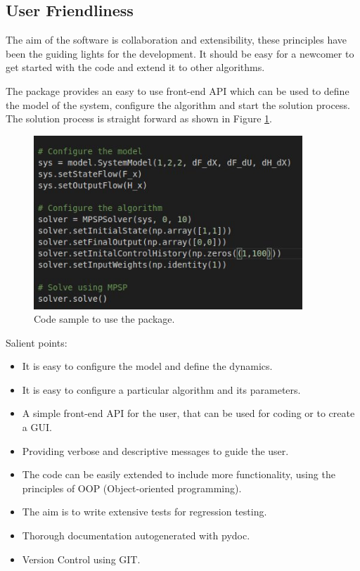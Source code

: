\documentclass[12pt]{article}
\begin{document}
\subsection{User Friendliness}

The aim of the software is collaboration and extensibility, these principles have been the guiding lights for the development. It should be easy for a newcomer to get started with the code and extend it to other algorithms.

The package provides an easy to use front-end API which can be used to define the model of the system, configure the algorithm and start the solution process. The solution process is straight forward as shown in Figure \ref{fig:CodeUsage}.

\begin{figure}[!htb]
    \centering
    \includegraphics[width=0.9\textwidth]{img/CodeUsage.png}
    \caption{Code sample to use the package.}
    \label{fig:CodeUsage}
\end{figure}

Salient points: 
\begin{itemize}
\item It is easy to configure the model and define the dynamics.
\item It is easy to configure a particular algorithm and its parameters. 
\item A simple front-end API for the user, that can be used for coding or to create a GUI. 
\item Providing verbose and descriptive messages to guide the user.
\item The code can be easily extended to include more functionality, using the principles of OOP (Object-oriented programming).
\item The aim is to write extensive tests for regression testing. 
\item Thorough documentation autogenerated with pydoc. 
\item Version Control using GIT.
\end{itemize}
\end{document}
